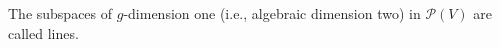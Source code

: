 The subspaces of $g$-dimension one (i.e., algebraic dimension two) in $\mathcal{P}(V)$ are called lines.
